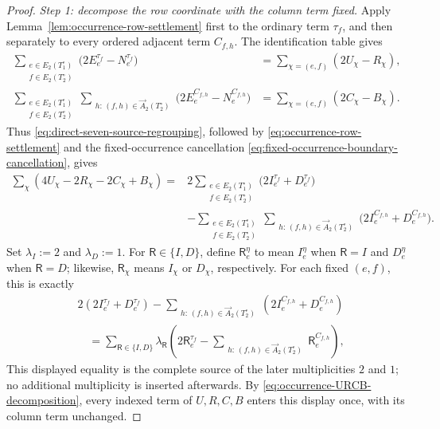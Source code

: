 \documentclass[11pt]{article}
\begin{document}
\begin{proof}
\emph{Step 1: decompose the row coordinate with the column term fixed.}
Apply Lemma~\ref{lem:occurrence-row-settlement} first to the ordinary term
$\tau_f$, and then separately to every ordered adjacent term $C_{f,h}$.  The
identification table gives
\[
\begin{aligned}
\sum_{\substack{e\in E_2(T_1^\circ)\\f\in E_2(T_2^\circ)}}
\bigl(2E_e^{\tau_f}-N_e^{\tau_f}\bigr)
 &=\sum_{\chi=(e,f)}(2U_\chi-R_\chi),\\
\sum_{\substack{e\in E_2(T_1^\circ)\\f\in E_2(T_2^\circ)}}
\sum_{\substack{h:\,(f,h)\in
\overrightarrow A_2(T_2^\circ)}}
\bigl(2E_e^{C_{f,h}}-N_e^{C_{f,h}}\bigr)
 &=\sum_{\chi=(e,f)}(2C_\chi-B_\chi).
\end{aligned}
\]
Thus \eqref{eq:direct-seven-source-regrouping}, followed by
\eqref{eq:occurrence-row-settlement} and the fixed-occurrence cancellation
\eqref{eq:fixed-occurrence-boundary-cancellation}, gives
\[
\begin{aligned}
\sum_\chi(4U_\chi-2R_\chi-2C_\chi+B_\chi)
={}&2\sum_{\substack{e\in E_2(T_1^\circ)\\f\in E_2(T_2^\circ)}}
\bigl(2I_e^{\tau_f}+D_e^{\tau_f}\bigr)\\
&-\sum_{\substack{e\in E_2(T_1^\circ)\\f\in E_2(T_2^\circ)}}
\sum_{\substack{h:\,(f,h)\in
\overrightarrow A_2(T_2^\circ)}}
\bigl(2I_e^{C_{f,h}}+D_e^{C_{f,h}}\bigr).
\end{aligned}
\]
Set $\lambda_I:=2$ and $\lambda_D:=1$.  For
$\mathsf R\in\{I,D\}$, define $\mathsf R_e^\eta$ to mean $I_e^\eta$ when
$\mathsf R=I$ and $D_e^\eta$ when $\mathsf R=D$; likewise,
$\mathsf R_\chi$ means $I_\chi$ or $D_\chi$, respectively.
For each fixed $(e,f)$, this is exactly
\[
\begin{aligned}
&2(2I_e^{\tau_f}+D_e^{\tau_f})
-\sum_{\substack{h:\,(f,h)\in\overrightarrow A_2(T_2^\circ)}}
 (2I_e^{C_{f,h}}+D_e^{C_{f,h}})\\
&\quad=
\sum_{\mathsf R\in\{I,D\}}\lambda_{\mathsf R}
\left(
2\mathsf R_e^{\tau_f}
-\sum_{\substack{h:\,(f,h)\in\overrightarrow A_2(T_2^\circ)}}
\mathsf R_e^{C_{f,h}}
\right),
\end{aligned}
\]
This displayed equality is the complete source of the later multiplicities
$2$ and $1$; no additional multiplicity is inserted afterwards.
By \eqref{eq:occurrence-URCB-decomposition}, every indexed term of $U,R,C,B$
enters this display once, with its column term unchanged.


\end{proof}
\end{document}
